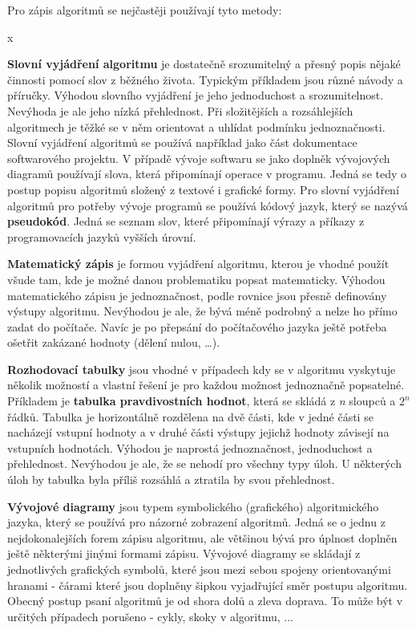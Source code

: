Pro zápis algoritmů se nejčastěji používají tyto metody:

\vskip 4mm
x
\vskip 4mm

{\bf Slovní vyjádření algoritmu} je dostatečně srozumitelný a přesný popis nějaké činnosti pomocí slov z běžného života. Typickým příkladem jsou různé návody a příručky. Výhodou slovního vyjádření je jeho jednoduchost a srozumitelnost. Nevýhoda je ale jeho nízká přehlednost. Při složitějších a rozsáhlejších algoritmech je těžké se v něm orientovat a uhlídat podmínku jednoznačnosti. Slovní vyjádření algoritmů se používá například jako část dokumentace softwarového projektu.
V případě vývoje softwaru se jako doplněk vývojových diagramů používají slova, která připomínají operace v programu. Jedná se tedy o postup popisu algoritmů složený z textové i grafické formy. Pro slovní vyjádření algoritmů pro potřeby vývoje programů se používá kódový jazyk, který se nazývá {\bf pseudokód}. Jedná se seznam slov, které připomínají výrazy a příkazy z programovacích jazyků vyšších úrovní.

{\bf Matematický zápis} je formou vyjádření algoritmu, kterou je vhodné použít všude tam, kde je možné danou problematiku popsat matematicky. Výhodou matematického zápisu je jednoznačnost, podle rovnice jsou přesně definovány výstupy algoritmu. Nevýhodou je ale, že bývá méně podrobný a nelze ho přímo zadat do počítače. Navíc je po přepsání do počítačového jazyka ještě potřeba ošetřit zakázané hodnoty (dělení nulou, …). 

{\bf Rozhodovací tabulky} jsou vhodné v případech kdy se v algoritmu vyskytuje několik možností a vlastní řešení je pro každou možnost jednoznačně popsatelné. Příkladem je {\bf tabulka pravdivostních hodnot}, která se skládá z {\it n} sloupců a $2^n$ řádků. Tabulka je horizontálně rozdělena na dvě části, kde v jedné části se nacházejí vstupní hodnoty a v druhé části výstupy jejichž hodnoty závisejí na vstupních hodnotách. Výhodou je naprostá jednoznačnost, jednoduchost a přehlednost. Nevýhodou je ale, že se nehodí pro všechny typy úloh. U některých úloh by tabulka byla příliš rozsáhlá a ztratila by svou přehlednost.

{\bf Vývojové diagramy} jsou typem symbolického (grafického) algoritmického jazyka, který se používá pro názorné zobrazení algoritmů. Jedná se o jednu z nejdokonalejších forem zápisu algoritmu, ale většinou bývá pro úplnost doplněn ještě některými jinými formami zápisu. Vývojové diagramy se skládají z jednotlivých grafických symbolů, které jsou mezi sebou spojeny orientovanými hranami - čárami které jsou doplněny šipkou vyjadřující směr postupu algoritmu. Obecný postup psaní algoritmů je od shora dolů a zleva doprava. To může být v určitých případech porušeno - cykly, skoky v algoritmu, ...  


